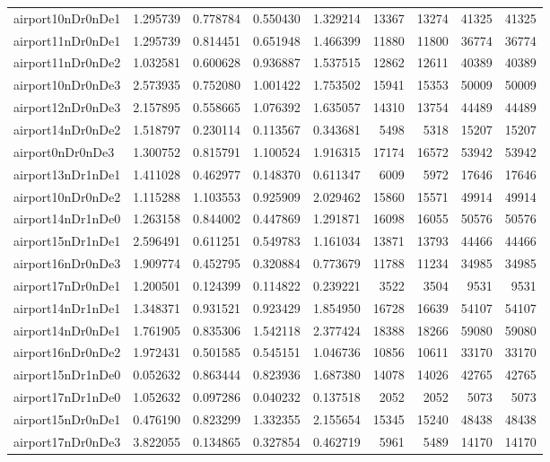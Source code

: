 \begin{longtable}{|l|r|r|r|r|r|r|r|r|}
airport10nDr0nDe1 & 1.295739 & 0.778784 & 0.550430 & 1.329214 & 13367 & 13274 & 41325 & 41325 \\
airport11nDr0nDe1 & 1.295739 & 0.814451 & 0.651948 & 1.466399 & 11880 & 11800 & 36774 & 36774 \\
airport11nDr0nDe2 & 1.032581 & 0.600628 & 0.936887 & 1.537515 & 12862 & 12611 & 40389 & 40389 \\
airport10nDr0nDe3 & 2.573935 & 0.752080 & 1.001422 & 1.753502 & 15941 & 15353 & 50009 & 50009 \\
airport12nDr0nDe3 & 2.157895 & 0.558665 & 1.076392 & 1.635057 & 14310 & 13754 & 44489 & 44489 \\
airport14nDr0nDe2 & 1.518797 & 0.230114 & 0.113567 & 0.343681 & 5498 & 5318 & 15207 & 15207 \\
airport0nDr0nDe3 & 1.300752 & 0.815791 & 1.100524 & 1.916315 & 17174 & 16572 & 53942 & 53942 \\
airport13nDr1nDe1 & 1.411028 & 0.462977 & 0.148370 & 0.611347 & 6009 & 5972 & 17646 & 17646 \\
airport10nDr0nDe2 & 1.115288 & 1.103553 & 0.925909 & 2.029462 & 15860 & 15571 & 49914 & 49914 \\
airport14nDr1nDe0 & 1.263158 & 0.844002 & 0.447869 & 1.291871 & 16098 & 16055 & 50576 & 50576 \\
airport15nDr1nDe1 & 2.596491 & 0.611251 & 0.549783 & 1.161034 & 13871 & 13793 & 44466 & 44466 \\
airport16nDr0nDe3 & 1.909774 & 0.452795 & 0.320884 & 0.773679 & 11788 & 11234 & 34985 & 34985 \\
airport17nDr0nDe1 & 1.200501 & 0.124399 & 0.114822 & 0.239221 & 3522 & 3504 & 9531 & 9531 \\
airport14nDr1nDe1 & 1.348371 & 0.931521 & 0.923429 & 1.854950 & 16728 & 16639 & 54107 & 54107 \\
airport14nDr0nDe1 & 1.761905 & 0.835306 & 1.542118 & 2.377424 & 18388 & 18266 & 59080 & 59080 \\
airport16nDr0nDe2 & 1.972431 & 0.501585 & 0.545151 & 1.046736 & 10856 & 10611 & 33170 & 33170 \\
airport15nDr1nDe0 & 0.052632 & 0.863444 & 0.823936 & 1.687380 & 14078 & 14026 & 42765 & 42765 \\
airport17nDr1nDe0 & 1.052632 & 0.097286 & 0.040232 & 0.137518 & 2052 & 2052 & 5073 & 5073 \\
airport15nDr0nDe1 & 0.476190 & 0.823299 & 1.332355 & 2.155654 & 15345 & 15240 & 48438 & 48438 \\
airport17nDr0nDe3 & 3.822055 & 0.134865 & 0.327854 & 0.462719 & 5961 & 5489 & 14170 & 14170 \\

\end{longtable}
